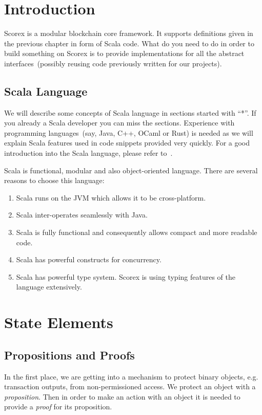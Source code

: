 \documentclass[]{report}   %
\begin{document}
\section{Introduction}     %

Scorex is a modular blockchain core framework. It supports definitions given in the previous chapter in form of Scala code. What do you need to do in order to build something on Scorex is to provide implementations for all the abstract interfaces~(possibly reusing code previously written for our projects).

\subsection{Scala Language}         %

We will describe some concepts of Scala language in sections started with ``*''. If you already a Scala developer you can miss the sections. Experience with programming languages~(say, Java, C++, OCaml or Rust) is needed as we will explain Scala features used in code snippets provided very quickly. For a good introduction into the Scala language, please refer to~\cite{odersky2008programming}.

Scala is functional, modular and also object-oriented language. There are several reasons to choose this language:
\begin{enumerate}
	\item Scala runs on the JVM which allows it to be cross-platform.
	\item Scala inter-operates seamlessly with Java.
	\item Scala is fully functional and consequently allows compact and more readable code.
	\item Scala has powerful constructs for concurrency.
	\item Scala has powerful type system. Scorex is using typing features of the language extensively.
\end{enumerate}

\section{State Elements}

\subsection{Propositions and Proofs}

In the first place, we are getting into a mechanism to protect binary objects, e.g. transaction outputs, from non-permissioned access. We protect an object with a \textit{proposition}. Then in order to make an action with an object it is needed to provide a \textit{proof} for its proposition. 
\end{document}
